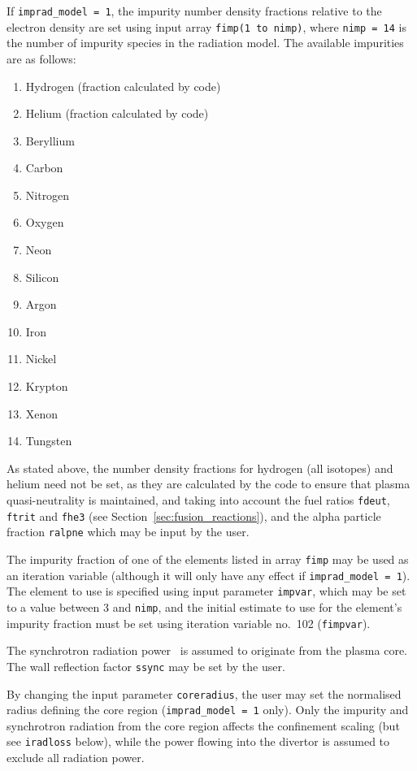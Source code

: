 \documentclass[11pt,a4paper]{report}
\begin{document}
If \texttt{imprad\_model = 1}, the impurity number density fractions relative
to the electron density are set using input array \texttt{fimp(1 to nimp)},
where \texttt{nimp = 14} is the number of impurity species in the radiation
model. The available impurities are as follows:
\begin{enumerate}
\item Hydrogen (fraction calculated by code)
\item Helium (fraction calculated by code)
\item Beryllium
\item Carbon
\item Nitrogen
\item Oxygen
\item Neon
\item Silicon
\item Argon
\item Iron
\item Nickel
\item Krypton
\item Xenon
\item Tungsten
\end{enumerate}
As stated above, the number density fractions for hydrogen (all isotopes) and
helium need not be set, as they are calculated by the code to ensure that
plasma quasi-neutrality is maintained, and taking into account the fuel ratios
\texttt{fdeut}, \texttt{ftrit} and \texttt{fhe3} (see
Section~\ref{sec:fusion_reactions}), and the alpha particle fraction
\texttt{ralpne} which may be input by the user.

The impurity fraction of one of the elements listed in array \texttt{fimp} may
be used as an iteration variable (although it will only have any effect if
\texttt{imprad\_model = 1}). The element to use is specified using input
parameter \texttt{impvar}, which may be set to a value between 3 and
\texttt{nimp}, and the initial estimate to use for the element's impurity
fraction must be set using iteration variable no.\ 102 (\texttt{fimpvar}).

The synchrotron radiation power~\cite{albajar, fidone} is assumed to originate
from the plasma core. The wall reflection factor \texttt{ssync} may be set by
the user.

By changing the input parameter \texttt{coreradius}, the user may set the
normalised radius defining the core region (\texttt{imprad\_model = 1}
only). Only the impurity and synchrotron radiation from the core region
affects the confinement scaling (but see \texttt{iradloss} below), while the
power flowing into the divertor is assumed to exclude all radiation power.
\end{document}
